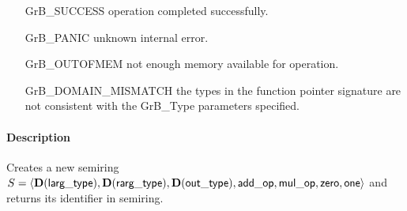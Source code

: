 \begin{itemize}[leftmargin=2.1in]
\item[{\sf GrB\_SUCCESS}]           operation completed successfully.
\item[{\sf GrB\_PANIC}]             unknown internal error.
\item[{\sf GrB\_OUTOFMEM}]          not enough memory available for operation.
\item[{\sf GrB\_DOMAIN\_MISMATCH}]  the types in the function pointer signature are not   
                                    consistent with the {\sf GrB\_Type} parameters specified.
\end{itemize}

\paragraph{Description}

Creates a new semiring $S = \langle \bold{D}({\sf larg\_type}), \bold{D}({\sf rarg\_type}), 
\bold{D}({\sf out\_type}), {\sf add\_op}, {\sf mul\_op}, {\sf zero}, {\sf one} \rangle$ and 
returns its identifier in {\sf semiring}.

